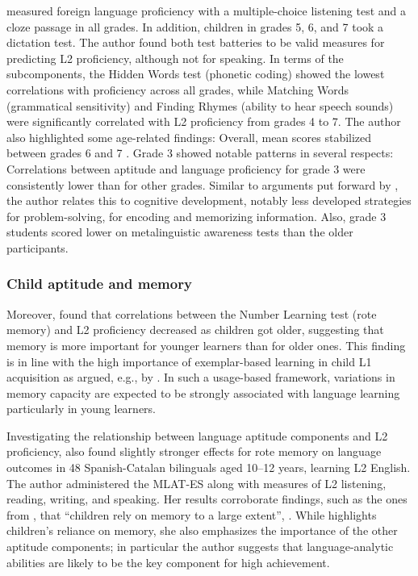 \documentclass[output=paper]{langscibook}
\begin{document}
\citet{SuarezVilagran2010} measured foreign language proficiency with a multiple-choice listening test and a cloze passage in all grades. In addition, children in grades 5, 6, and 7 took a dictation test. The author found both test batteries to be valid measures for predicting L2 proficiency, although not for speaking. In terms of the subcomponents, the Hidden Words test (phonetic coding) showed the lowest correlations with proficiency across all grades, while Matching Words (grammatical sensitivity) and Finding Rhymes (ability to hear speech sounds) were significantly correlated with L2 proficiency from grades 4 to 7. The author also highlighted some age-related findings: Overall, mean scores stabilized between grades 6 and 7 \citep[349]{SuarezVilagran2010}. Grade 3 showed notable patterns in several respects: Correlations between aptitude and language proficiency for grade 3 were consistently lower than for other grades. Similar to arguments put forward by \citet{Kiss2009}, the author relates this to cognitive development, notably less developed strategies for problem-solving, for encoding and memorizing information. Also, grade 3 students scored lower on metalinguistic awareness tests than the older participants.

\subsubsection{Child aptitude and memory} %

Moreover, \citet{SuarezVilagran2010} found that correlations between the Number Learning test (rote memory) and L2 proficiency decreased as children got older, suggesting that memory is more important for younger learners than for older ones. This finding is in line with the high importance of exemplar-based learning in child L1 acquisition as argued, e.g., by \citet{Tomasello2005}. In such a usage-based framework, variations in memory capacity are expected to be strongly associated with language learning particularly in young learners.

Investigating the relationship between language aptitude components and L2 proficiency, \citet{Munoz2014} also found slightly stronger effects for rote memory on language outcomes in 48 Spanish-Catalan bilinguals aged 10--12 years, learning L2 English. The author administered the MLAT-ES along with measures of L2 listening, reading, writing, and speaking. Her results corroborate findings, such as the ones from \citet{SuarezVilagran2010}, that “children rely on memory to a large extent”, \citep[64]{Munoz2014}. While \citet{Munoz2014} highlights children’s reliance on memory, she also emphasizes the importance of the other aptitude components; in particular the author suggests that language-analytic abilities are likely to be the key component for high achievement. 
\end{document}
